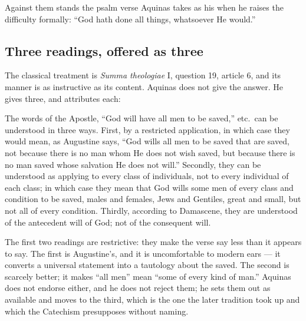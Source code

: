Against them stands the psalm verse Aquinas takes as his  when he raises the difficulty formally: ``God hath done all things, whatsoever He would.''

\subsection{Three readings, offered as three}

The classical treatment is \emph{Summa theologiae} I, question 19, article 6, and its manner is as instructive as its content. Aquinas does not give the answer. He gives three, and attributes each:

\begin{studyframe}
The words of the Apostle, ``God will have all men to be saved,'' etc.\ can be understood in three ways. First, by a restricted application, in which case they would mean, as Augustine says, ``God wills all men to be saved that are saved, not because there is no man whom He does not wish saved, but because there is no man saved whose salvation He does not will.'' Secondly, they can be understood as applying to every class of individuals, not to every individual of each class; in which case they mean that God wills some men of every class and condition to be saved, males and females, Jews and Gentiles, great and small, but not all of every condition. Thirdly, according to Damascene, they are understood of the antecedent will of God; not of the consequent will.
\end{studyframe}

The first two readings are restrictive: they make the verse say less than it appears to say. The first is Augustine's, and it is uncomfortable to modern ears --- it converts a universal statement into a tautology about the saved. The second is scarcely better; it makes ``all men'' mean ``some of every kind of man.'' Aquinas does not endorse either, and he does not reject them; he sets them out as available and moves to the third, which is the one the later tradition took up and which the Catechism presupposes without naming.

